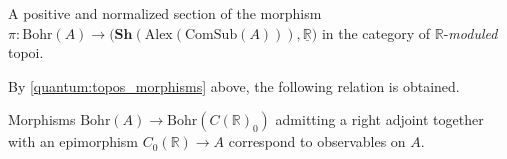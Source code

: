     \begin{property}[States]
        A positive and normalized section of the morphism $\pi:\mathrm{Bohr}(A)\rightarrow\bigl(\mathbf{Sh}(\mathrm{Alex}(\mathrm{ComSub}(A))),\underline{\mathbb{R}}\bigr)$ in the category of $\mathbb{R}$-\textit{moduled} topoi.
    \end{property}

    By \cref{quantum:topos_morphisms} above, the following relation is obtained.
    \begin{property}[Observables]
        Morphisms $\mathrm{Bohr}(A)\rightarrow\mathrm{Bohr}(C(\mathbb{R})_0)$ admitting a right adjoint together with an epimorphism $C_0(\mathbb{R})\rightarrow A$ correspond to observables on $A$.
    \end{property}